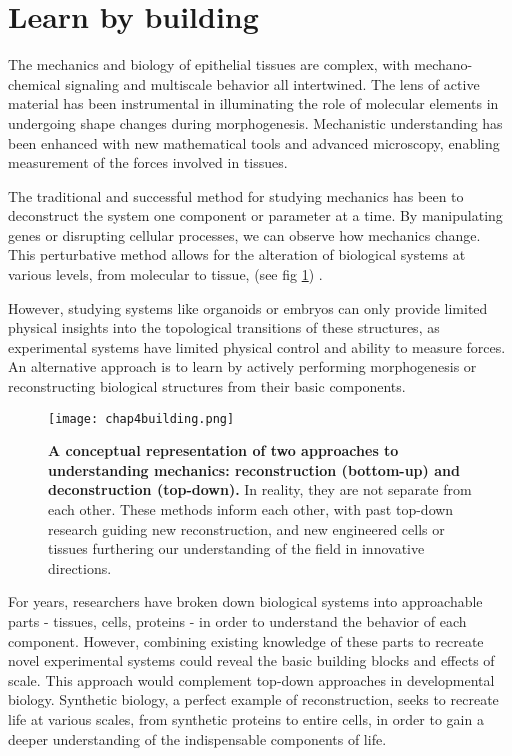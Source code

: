 
\hypertarget{learn-by-building}{%
	\section{Learn by building}\label{learn-by-building}}

The mechanics and biology of epithelial tissues are complex, with mechano-chemical signaling and multiscale behavior all intertwined. The lens of active material has been instrumental in illuminating the role of molecular elements in undergoing shape changes during morphogenesis. Mechanistic understanding has been enhanced with new mathematical tools and advanced microscopy, enabling measurement of the forces involved in tissues.

The traditional and successful method for studying mechanics has been to deconstruct the system one component or parameter at a time. By manipulating genes or disrupting cellular processes, we can observe how mechanics change. This perturbative method allows for the alteration of biological systems at various levels, from molecular to tissue, (see fig \ref{fig_4_1}) .

However, studying systems like organoids or embryos can only provide limited physical insights into the topological transitions of these structures, as experimental systems have limited physical control and ability to measure forces. An alternative approach is to learn by actively performing morphogenesis or reconstructing biological structures from their basic components.

\begin{figure}
	\centering
	\texttt{[image: chap4building.png]}
	\caption{\label{fig_4_1} \textbf{A conceptual representation of two approaches to understanding mechanics: reconstruction (bottom-up) and deconstruction (top-down).} In reality, they are not separate from each other. These methods inform each other, with past top-down research guiding new reconstruction, and new engineered cells or tissues furthering our understanding of the field in innovative directions.
}
\end{figure}

For years, researchers have broken down biological systems into approachable parts - tissues, cells, proteins - in order to understand the behavior of each component. However, combining existing knowledge of these parts to recreate novel experimental systems could reveal the basic building blocks and effects of scale. This approach would complement top-down approaches in developmental biology. Synthetic biology, a perfect example of reconstruction, seeks to recreate life at various scales, from synthetic proteins to entire cells, in order to gain a deeper understanding of the indispensable components of life.

